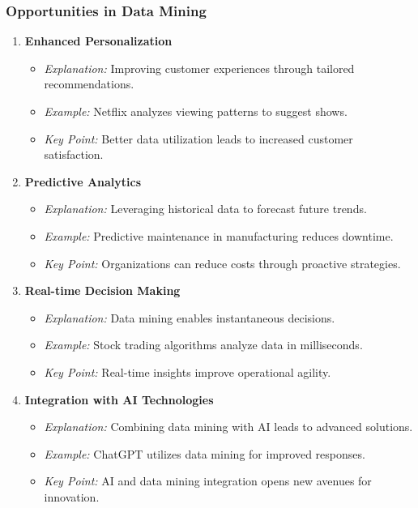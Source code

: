 \documentclass[aspectratio=169]{beamer}
\begin{document}
\begin{frame}[fragile]
    \frametitle{Opportunities in Data Mining}
    \begin{enumerate}
        \item \textbf{Enhanced Personalization}
            \begin{itemize}
                \item \textit{Explanation:} Improving customer experiences through tailored recommendations.
                \item \textit{Example:} Netflix analyzes viewing patterns to suggest shows.
                \item \textit{Key Point:} Better data utilization leads to increased customer satisfaction.
            \end{itemize}

        \item \textbf{Predictive Analytics}
            \begin{itemize}
                \item \textit{Explanation:} Leveraging historical data to forecast future trends.
                \item \textit{Example:} Predictive maintenance in manufacturing reduces downtime.
                \item \textit{Key Point:} Organizations can reduce costs through proactive strategies.
            \end{itemize}

        \item \textbf{Real-time Decision Making}
            \begin{itemize}
                \item \textit{Explanation:} Data mining enables instantaneous decisions.
                \item \textit{Example:} Stock trading algorithms analyze data in milliseconds.
                \item \textit{Key Point:} Real-time insights improve operational agility.
            \end{itemize}

        \item \textbf{Integration with AI Technologies}
            \begin{itemize}
                \item \textit{Explanation:} Combining data mining with AI leads to advanced solutions.
                \item \textit{Example:} ChatGPT utilizes data mining for improved responses.
                \item \textit{Key Point:} AI and data mining integration opens new avenues for innovation.
            \end{itemize}
    \end{enumerate}
\end{frame}
\end{document}
